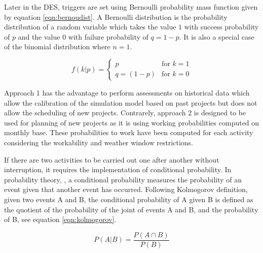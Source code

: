 Later in the DES, triggers are set using Bernoulli probability mass function given by equation \ref{eqn:bernoudist}. A Bernoulli distribution is the probability distribution of a random variable which takes the value $1$ with success probability of $p$ and the value $0$ with failure probability of $q=1-p$.  It is also a special case of the binomial distribution where $n=1$.

\begin{equation}
\label{eqn:bernoudist}
f\left(k \vert p \right) = \begin{cases} p & \text{for $k=1$} \\ q=(1-p) & \text{for $k=0$} \end{cases}
\end{equation}






Approach 1 has the advantage to perform assessments on historical data which allow the calibration of the simulation model based on past projects but does not allow the scheduling of new projects. Contrarely, approach 2 is designed to be used for planning of new projects as it is using working probabilities computed on monthly base. These probabilities to work have been computed for each activity considering the workability and weather window restrictions.



If there are two activities to be carried out one after another without interruption, it requires the implementation of conditional probability.  
In probability theory, \cite{Thalemann2012}, a conditional probability measures the probability of an event given that another event has occurred. Following Kolmogorov definition, given two events A and B, the conditional probability of A given B is defined as the quotient of the probability of the joint of events A and B, and the probability of B, see equation \ref{eqn:kolmogorov}.

\begin{equation}
\label{eqn:kolmogorov}
P \left(A \vert B \right) = \frac{P \left(A \cap B \right)}{P \left( B \right)}
\end{equation}

